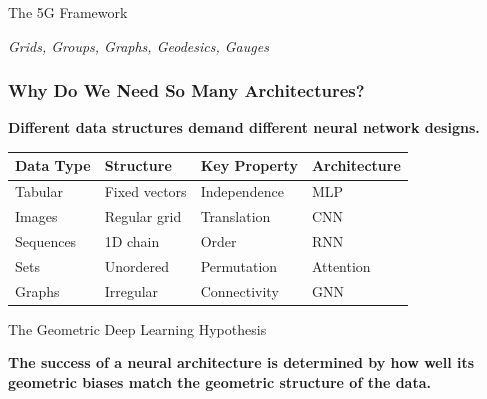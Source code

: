 \begin{frame}[fragile]\frametitle{}
\begin{center}
{\Large The 5G Framework}

\vspace{0.3cm}
{\em Grids, Groups, Graphs, Geodesics, Gauges}
\end{center}
\end{frame}

\begin{frame}[fragile]\frametitle{Why Do We Need So Many Architectures?}

\begin{center}
\textbf{Different data structures demand different neural network designs.}
\end{center}

\begin{center}
\begin{tabular}{llll}
\hline
\textbf{Data Type} & \textbf{Structure} & \textbf{Key Property} & \textbf{Architecture} \\
\hline
Tabular & Fixed vectors & Independence & MLP \\
Images & Regular grid & Translation & CNN \\
Sequences & 1D chain & Order & RNN \\
Sets & Unordered & Permutation & Attention \\
Graphs & Irregular & Connectivity & GNN \\
\hline
\end{tabular}
\end{center}

\vspace{0.3cm}

\begin{block}{The Geometric Deep Learning Hypothesis}
\begin{center}
\textbf{The success of a neural architecture is determined by how well its geometric biases match the geometric structure of the data.}
\end{center}
\end{block}

\end{frame}

